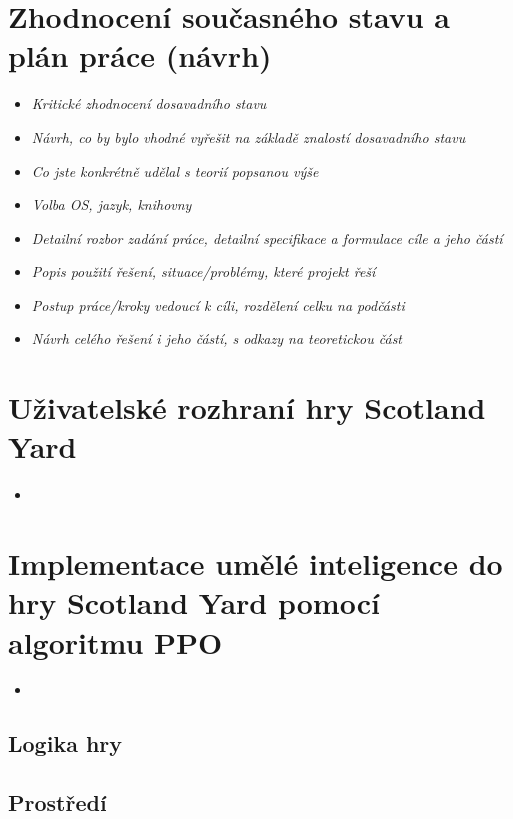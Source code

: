 \chapter{Zhodnocení současného stavu a plán práce (návrh)}
\label{navrh}
\begin{itemize}
  \item \emph {Kritické zhodnocení dosavadního stavu}
  \item \emph {Návrh, co by bylo vhodné vyřešit na základě znalostí dosavadního stavu}
  \item \emph {Co jste konkrétně udělal s teorií popsanou výše}
  \item \emph {Volba OS, jazyk, knihovny}
  \item \emph {Detailní rozbor zadání práce, detailní specifikace a formulace cíle a jeho částí}
  \item \emph {Popis použití řešení, situace/problémy, které projekt řeší}
  \item \emph {Postup práce/kroky vedoucí k cíli, rozdělení celku na podčásti}
  \item \emph {Návrh celého řešení i jeho částí, s odkazy na teoretickou část}
\end{itemize}

\chapter{Uživatelské rozhraní hry Scotland Yard}
\label{rozhrani}

\begin{itemize}
  \item \emph {}
\end{itemize}

\chapter{Implementace umělé inteligence do hry Scotland Yard pomocí algoritmu PPO}
\label{implementace}

\begin{itemize}
  \item \emph {}
\end{itemize}

\section{Logika hry}
\section{Prostředí}
